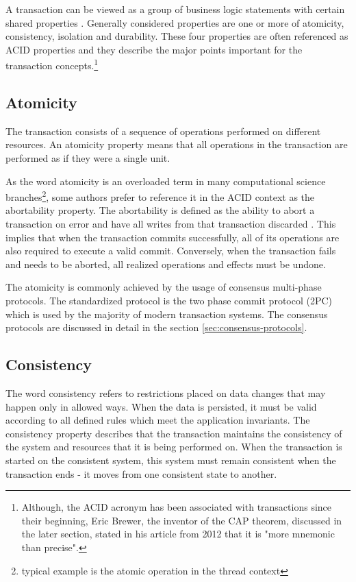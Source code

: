 \documentclass[oneside,
  digital, %
  table,   %
  nolof,     %
  nolot,     %
]{fithesis3}
\begin{document}
A transaction can be viewed as a group of business logic statements with certain shared properties \cite{nar_wf}. Generally considered properties are one or more of atomicity, consistency, isolation and durability. These four properties are often referenced as ACID properties \cite{haerder_reuter_1983} and they describe the major points important for the transaction concepts.\footnote{Although, the ACID acronym has been associated with transactions since their beginning, Eric Brewer, the inventor of the CAP theorem, discussed in the later section, stated in his article from 2012 that it is "more mnemonic than precise".\cite{cap_12years}}

\subsection{Atomicity}

The transaction consists of a sequence of operations performed on different resources. An atomicity property means that all operations in the transaction are performed as if they were a single unit. 

As the word atomicity is an overloaded term in many computational science branches\footnote{typical example is the atomic operation in the thread context}, some authors prefer to reference it in the ACID context as the abortability property. The abortability is defined as  the ability to abort a transaction on error and have all writes from that transaction discarded \cite{design_data_intens_apps}. This implies that when the transaction commits successfully, all of its operations are also required to execute a valid commit. Conversely, when the transaction fails and needs to be aborted, all realized operations and effects must be undone.

The atomicity is commonly achieved by the usage of consensus multi-phase protocols. The standardized protocol is the two phase commit protocol (2PC) which is used by the majority of modern transaction systems. The consensus protocols are discussed in detail in the section \ref{sec:consensus-protocols}.

\subsection{Consistency}

The word consistency refers to restrictions placed on data changes that may happen only in allowed ways. When the data is persisted, it must be valid according to all defined rules which meet the application invariants. The consistency property describes that the transaction maintains the consistency of the system and resources that it is being performed on. When the transaction is started on the consistent system, this system must remain consistent when the transaction ends - it moves from one consistent state to another.
\end{document}

